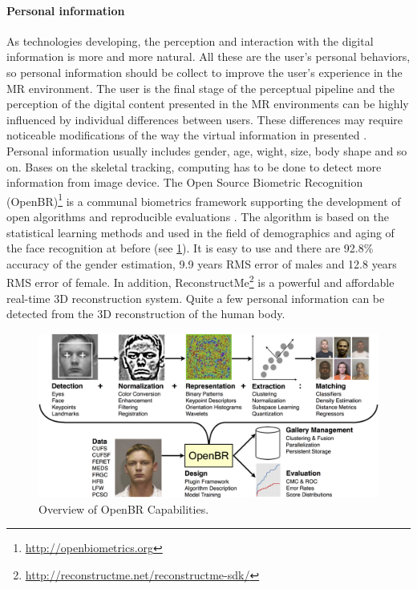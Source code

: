 \paragraph{Personal information} %
As technologies developing, the perception and interaction with the digital information is more and more natural. All these are the user's personal behaviors, so personal information should be collect to improve the user's experience in the MR environment.
The user is the final stage of the perceptual pipeline and the perception of the digital content presented in the MR environments can be highly influenced by individual differences between users. These differences may require noticeable modifications of the way the virtual information in presented \cite{Kruijff2010}.
Personal information usually includes gender, age, wight, size, body shape and so on. 
Bases on the skeletal tracking, computing has to be done to detect more information from image device. 
The Open Source Biometric Recognition (OpenBR)\footnote{\url{http://openbiometrics.org}} is a communal biometrics framework supporting the development of open algorithms and reproducible evaluations \cite{Klontz2013}. 
The algorithm is based on the statistical learning methods and used in the field of demographics and aging of the face recognition at before (see \figurename{\ref{fig:2:OpenBR}}). It is easy to use and there are 92.8\% accuracy of the gender estimation, 9.9 years RMS error of males and 12.8 years RMS error of female. In addition, ReconstructMe\footnote{\url{http://reconstructme.net/reconstructme-sdk/}} is a powerful and affordable real-time 3D reconstruction system. Quite a few personal information can be detected from the 3D reconstruction of the human body.
\begin{figure}
	\centering
	\includegraphics[width=0.7\linewidth]{figures/3-PRMM/OpenBR.png}
	\caption[OpenBR]{Overview of OpenBR Capabilities.}
	\label{fig:2:OpenBR}
\end{figure}

